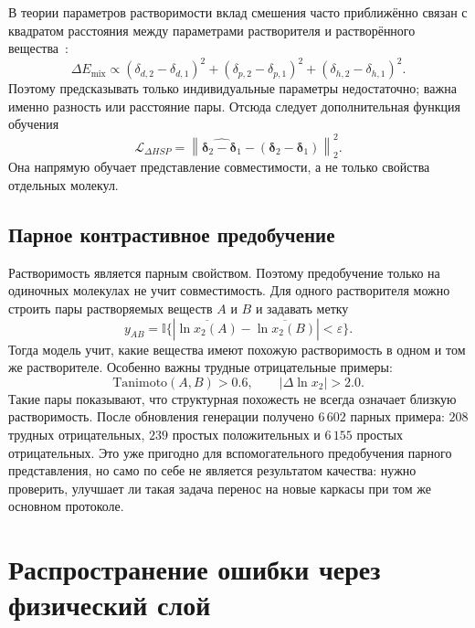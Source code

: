 \documentclass[11pt]{article}
\newcommand{\abs}[1]{\left\lvert #1 \right\rvert}
\theoremstyle{definition}
\begin{document}
В теории параметров растворимости вклад смешения часто приближённо связан с квадратом расстояния между параметрами растворителя и растворённого вещества~\cite{hansen2007}:
\begin{equation*}
    \Delta E_{\mathrm{mix}} \propto
    (\delta_{d,2}-\delta_{d,1})^2+
    (\delta_{p,2}-\delta_{p,1})^2+
    (\delta_{h,2}-\delta_{h,1})^2.
\end{equation*}
Поэтому предсказывать только индивидуальные параметры недостаточно; важна именно разность или расстояние пары. Отсюда следует дополнительная функция обучения
\begin{equation*}
    \mathcal L_{\Delta HSP}
    =\left\|\widehat{\boldsymbol\delta_2-\boldsymbol\delta_1}
    -(\boldsymbol\delta_2-\boldsymbol\delta_1)\right\|_2^2.
\end{equation*}
Она напрямую обучает представление совместимости, а не только свойства отдельных молекул.

\subsection{Парное контрастивное предобучение}

Растворимость является парным свойством. Поэтому предобучение только на одиночных молекулах не учит совместимость. Для одного растворителя можно строить пары растворяемых веществ $A$ и $B$ и задавать метку
\begin{equation*}
    y_{AB}=\mathbb I\{\abs{\overline{\ln x_2(A)}-\overline{\ln x_2(B)}}<\varepsilon\}.
\end{equation*}
Тогда модель учит, какие вещества имеют похожую растворимость в одном и том же растворителе. Особенно важны трудные отрицательные примеры:
\begin{equation*}
    \mathrm{Tanimoto}(A,B)>0.6,
    \qquad
    \abs{\Delta\ln x_2}>2.0.
\end{equation*}
Такие пары показывают, что структурная похожесть не всегда означает близкую растворимость. После обновления генерации получено $6\,602$ парных примера: $208$ трудных отрицательных, $239$ простых положительных и $6\,155$ простых отрицательных. Это уже пригодно для вспомогательного предобучения парного представления, но само по себе не является результатом качества: нужно проверить, улучшает ли такая задача перенос на новые каркасы при том же основном протоколе.

\section{Распространение ошибки через физический слой}
\label{app:error-propagation}
\end{document}
